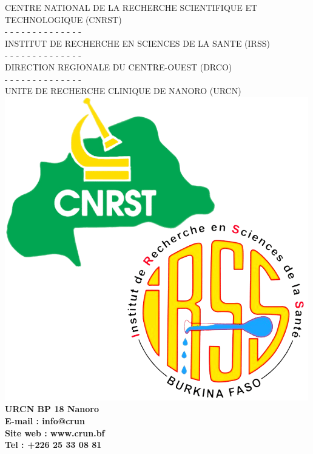 \documentclass[12pt,a4paper]{report}
\begin{document}
	\hspace{0.1\textwidth}
	\noindent
	\begin{minipage}[t]{0.4\textwidth}
		\fontsize{10pt}{0.4cm}\selectfont
		\begin{center}
			CENTRE NATIONAL DE LA RECHERCHE SCIENTIFIQUE ET TECHNOLOGIQUE (CNRST)\\
			- - - - - - - - - - - - - - \\
			INSTITUT DE RECHERCHE EN SCIENCES DE LA SANTE (IRSS)\\
			- - - - - - - - - - - - - - \\
			DIRECTION REGIONALE DU CENTRE-OUEST (DRCO)\\
			- - - - - - - - - - - - - -\\
			UNITE DE RECHERCHE CLINIQUE DE NANORO (URCN)\\ \vspace{0.4cm}
			\includegraphics[scale=0.20]{urcn1.png}
			\\
			\textbf{\small URCN BP 18 Nanoro} \\[-1ex]
			\textbf{\small E-mail : info@crun} \\[-1ex]
			\textbf{\small Site web : www.crun.bf} \\[-1ex]
			\textbf{\small Tel : +226 25 33 08 81} \\
		\end{center}
		
	\end{minipage}
	
\end{document}
